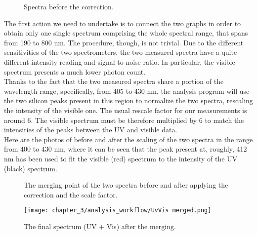 \begin{figure}[H]
    \centering
    \quad
    \caption{Spectra before the correction. }
    \label{fig:spectra_before_corr}
\end{figure}




The first action we need to undertake is to connect the two graphs in order to obtain only one single spectrum comprising the whole spectral range, that spans from 190 to 800 nm. The procedure, though, is not trivial. Due to the different sensitivities of the two spectrometers, the two measured spectra have a quite different intensity reading and signal to noise ratio. In particular, the visible spectrum presents a much lower photon count.
\\ 
Thanks to the fact that the two measured spectra share a portion of the wavelength range, specifically, from 405 to 430 nm, the analysis program will use the two silicon peaks present in this region to normalize the two spectra, rescaling the intensity of the visible one. The usual rescale factor for our measurements is around 6. The visible spectrum must be therefore multiplied by 6 to match the intensities of the peaks between the UV and visible data.
\\
Here are the photos of before and after the scaling of the two spectra in the range from 400 to 430 nm, where it can be seen that the peak present at, roughly, 412 nm has been used to fit the visible (red) spectrum to the intensity of the UV (black) spectrum.


\begin{figure}[H]
    \centering
    \quad
    \caption{The merging point of the two spectra before and after applying the correction and the scale factor. }
    \label{fig:spectra_mergin_point}
\end{figure}


\begin{figure}[H]
    \centering
    \texttt{[image: chapter\_3/analysis\_workflow/UvVis merged.png]} 
    \caption{The final spectrum (UV + Vis) after the merging. }
    \label{fig:merged_sepctrum}
\end{figure}


